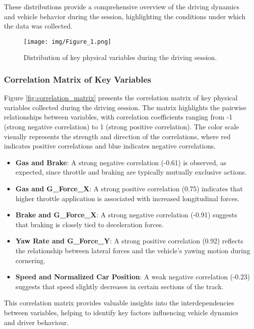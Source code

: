 \documentclass[a4paper,final,12pt]{report}
\begin{document}
These distributions provide a comprehensive overview of the driving dynamics and vehicle behavior during the session, highlighting the conditions under which the data was collected.

\begin{figure}[H]
    \centering
    \texttt{[image: img/Figure\_1.png]}
    \caption{Distribution of key physical variables during the driving session.}
    \label{fig:physical_variables_distribution}
\end{figure}

\subsubsection{Correlation Matrix of Key Variables}
Figure \ref{fig:correlation_matrix} presents the correlation matrix of key physical variables collected during the driving session. The matrix highlights the pairwise relationships between variables, with correlation coefficients ranging from -1 (strong negative correlation) to 1 (strong positive correlation). The color scale visually represents the strength and direction of the correlations, where red indicates positive correlations and blue indicates negative correlations.

\begin{itemize}
    \item \textbf{Gas and Brake}: A strong negative correlation (-0.61) is observed, as expected, since throttle and braking are typically mutually exclusive actions.
    \item \textbf{Gas and G\_Force\_X}: A strong positive correlation (0.75) indicates that higher throttle application is associated with increased longitudinal forces.
    \item \textbf{Brake and G\_Force\_X}: A strong negative correlation (-0.91) suggests that braking is closely tied to deceleration forces.
    \item \textbf{Yaw Rate and G\_Force\_Y}: A strong positive correlation (0.92) reflects the relationship between lateral forces and the vehicle's yawing motion during cornering.
    \item \textbf{Speed and Normalized Car Position}: A weak negative correlation (-0.23) suggests that speed slightly decreases in certain sections of the track.
\end{itemize}

This correlation matrix provides valuable insights into the interdependencies between variables, helping to identify key factors influencing vehicle dynamics and driver behaviour.
\end{document}
